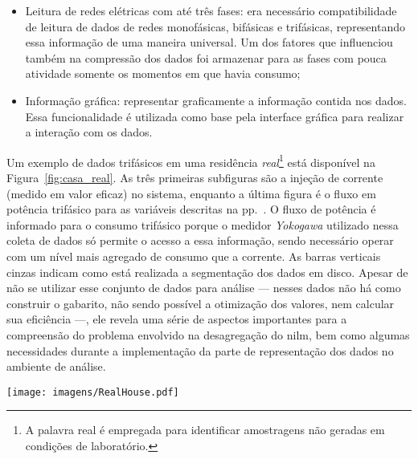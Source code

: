 \begin{itemize}
a informação segmentada, reduzindo drasticamente a velocidade dos
algoritmos já que a leitura em disco é lenta;
\item Leitura de redes elétricas com até três fases: era necessário
compatibilidade de leitura de dados de redes monofásicas, bifásicas e
trifásicas, representando essa informação de uma maneira universal. Um
dos fatores que influenciou também na compressão dos dados foi armazenar
para as fases com pouca atividade somente os momentos em que havia
consumo;
\item Informação gráfica: representar graficamente a informação contida
nos dados. Essa funcionalidade é utilizada como base pela interface
gráfica para realizar a interação com os dados.
\end{itemize}

Um exemplo de dados trifásicos em uma residência
\emph{real}\footnote{A palavra real é empregada para identificar
amostragens não geradas em condições de laboratório.} está
disponível na Figura~\ref{fig:casa_real}. As três primeiras subfiguras
são a injeção de corrente (medido em valor eficaz) no sistema,
enquanto a última figura é o fluxo em potência trifásico para as
variáveis descritas na pp.~\pageref{eq:ipqds}. O fluxo de potência é
informado para o consumo trifásico porque o medidor \emph{Yokogawa}
utilizado nessa coleta de dados só permite o acesso a essa informação,
sendo necessário operar com um nível mais agregado de consumo que a
corrente. As barras verticais cinzas indicam como está realizada a
segmentação dos dados em disco. Apesar de não se utilizar esse
conjunto de dados para análise --- nesses dados não há como construir
o gabarito, não sendo possível a otimização dos valores, nem calcular
sua eficiência ---, ele revela uma série de aspectos importantes para
a compreensão do problema envolvido na desagregação do \gls{nilm}, bem
como algumas necessidades durante a implementação da parte de
representação dos dados no ambiente de análise. 

\begin{sidewaysfigure}[p]
\centering
\texttt{[image: imagens/RealHouse.pdf]}
\caption[Informação gráfica para o interação com dados do medidor]
{Informação gráfica para a interação com os dados do medidor. Gráfico
gerado através do ambiente de análise para um conjunto de dados com
amostragem em 60~\acs{hz} de uma rede trifásica em uma casa
\emph{real} durante aproximadamente um dia de coleta. A injeção de
corrente para cada uma das três fases encontra-se nas subfiguras
superiores, enquanto o fluxo trifásico de potência entrando na rede
elétrica é representado na subfigura inferior. São utilizados as cores
azul, vermelho, verde e preto para as potências ativa, reativa,
harmônica e aparente, respectivamente.}
\label{fig:casa_real}
\end{sidewaysfigure}

